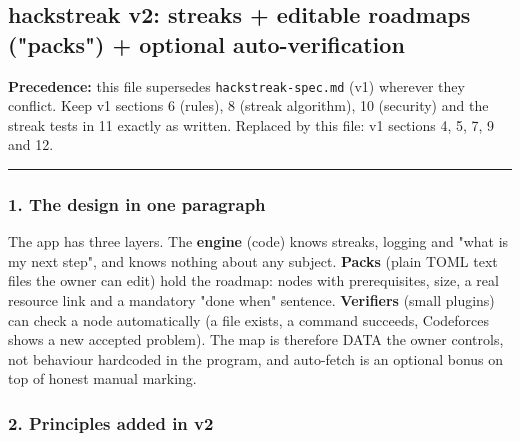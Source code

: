 \hypertarget{hackstreak-spec-v2-hackstreak-v2-streaks--editable-roadmaps-packs--optional-auto-verification}{%
\subsection{hackstreak v2: streaks + editable roadmaps ("packs") +
optional
auto-verification}\label{hackstreak-spec-v2-hackstreak-v2-streaks--editable-roadmaps-packs--optional-auto-verification}}

\textbf{Precedence:} this file supersedes \texttt{hackstreak-spec.md}
(v1) wherever they conflict. Keep v1 sections 6 (rules), 8 (streak
algorithm), 10 (security) and the streak tests in 11 exactly as written.
Replaced by this file: v1 sections 4, 5, 7, 9 and 12.

\begin{center}\rule{0.5\linewidth}{0.5pt}\end{center}

\hypertarget{hackstreak-spec-v2-1-the-design-in-one-paragraph}{%
\subsubsection{1. The design in one
paragraph}\label{hackstreak-spec-v2-1-the-design-in-one-paragraph}}

The app has three layers. The \textbf{engine} (code) knows streaks,
logging and "what is my next step", and knows nothing about any subject.
\textbf{Packs} (plain TOML text files the owner can edit) hold the
roadmap: nodes with prerequisites, size, a real resource link and a
mandatory "done when" sentence. \textbf{Verifiers} (small plugins) can
check a node automatically (a file exists, a command succeeds,
Codeforces shows a new accepted problem). The map is therefore DATA the
owner controls, not behaviour hardcoded in the program, and auto-fetch
is an optional bonus on top of honest manual marking.

\hypertarget{hackstreak-spec-v2-2-principles-added-in-v2}{%
\subsubsection{2. Principles added in
v2}\label{hackstreak-spec-v2-2-principles-added-in-v2}}


